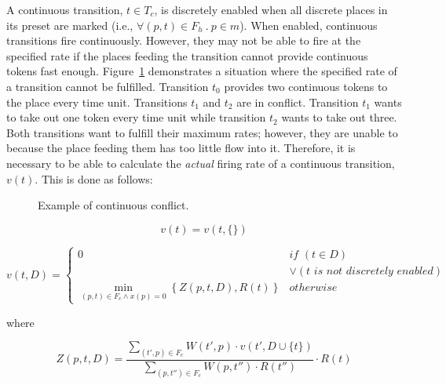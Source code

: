 \documentclass[11pt,times]{article}
\begin{document}
A continuous transition, $t \in T_c$, is discretely enabled when all
discrete places in its preset are marked 
(i.e., $\forall (p, t) \in F_h \ .\ p \in m$).
When enabled, continuous transitions fire continuously.
However, they may not be able to fire at the specified rate if
the places feeding the transition cannot provide continuous tokens fast
enough.  Figure~\ref{conflict} demonstrates a situation where the specified
rate of a transition cannot be fulfilled.  Transition $t_0$ provides two
continuous tokens to the place every time unit.  Transitions $t_1$ and $t_2$
are in conflict.  Transition $t_1$ wants to take out one token every time unit
while transition $t_2$ wants to take out three.  Both transitions want
to fulfill their maximum rates; however, they are unable to because
the place feeding them has too little flow into it.  Therefore, it is
necessary to be able to calculate the \emph{actual} firing rate of a
continuous transition, $v(t)$.  This is done as follows:

\begin{figure}[htbp]
\begin{center}
{\caption{\label{conflict} Example of continuous conflict.}}
\end{center}
\end{figure}

\[
v(t) = v(t, \{\})
\]

\[
v(t,D) = \left\{ \begin{array}{ll} \displaystyle
                     0 & \textit{if } (t \in D) \\
                       & \vee (t \textit{ is not discretely enabled}) \\
                     \displaystyle
                     \min_{(p, t) \in F_c \wedge x(p) = 0}
                     \left\{ Z(p,t,D), R(t)
                     \right\} & \mathit{otherwise}
                               
                   \end{array}
            \right.
\]

where

\[
Z(p,t,D) = \frac{\sum_{(t', p) \in F_c} W (t',p) \cdot v(t', D \cup
  \{t\}) }{\sum_{(p,t'')\in F_c} W(p,t'') \cdot R(t'')} \cdot R(t)
\]

\end{document}
